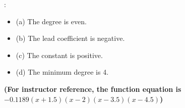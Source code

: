\documentclass[addpoints]{exam}
\begin{document}
\begin{questions}
\begin{solution}
:

\begin{itemize}
\item
(a) The degree is even.

\item
(b) The lead coefficient is negative.

\item
(c) The constant is positive.

\item
(d) The minimum degree is 4.

\end{itemize}
 \textbf{(For instructor reference, the function equation is \(-0.1189(x + 1.5)(x - 2)(x - 3.5)(x - 4.5)\))}
\end{solution}


\end{questions}
\end{document}
